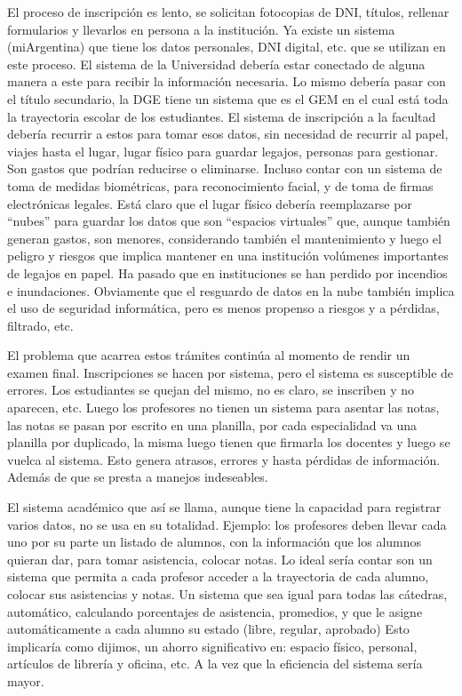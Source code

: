 \documentclass[a4paper]{article}
\begin{document}
El proceso de inscripción es lento, se solicitan fotocopias de DNI, títulos, rellenar formularios y llevarlos en persona a la institución. Ya existe un sistema (miArgentina) que tiene los datos personales, DNI digital, etc. que se utilizan en este proceso. El sistema de la Universidad debería estar conectado de alguna manera a este para recibir la información necesaria. Lo mismo debería pasar con el título secundario, la DGE tiene un sistema que es el GEM en el cual está toda la trayectoria escolar de los estudiantes.  El sistema de inscripción a la facultad debería recurrir a estos para tomar esos datos, sin necesidad de recurrir al papel, viajes hasta el lugar, lugar físico para guardar legajos, personas para gestionar. Son gastos que podrían reducirse o eliminarse. Incluso contar con un sistema de toma de medidas biométricas, para reconocimiento facial, y de toma de firmas electrónicas legales. Está claro que el lugar físico debería reemplazarse por “nubes” para guardar los datos que son “espacios virtuales” que, aunque también generan gastos, son menores, considerando también el mantenimiento y luego el peligro y riesgos que implica mantener en una institución volúmenes importantes de legajos en papel. Ha pasado que en instituciones se han perdido por incendios e inundaciones. Obviamente que el resguardo de datos en la nube también implica el uso de seguridad informática, pero es menos propenso a riesgos y a pérdidas, filtrado, etc. 

El problema que acarrea estos trámites continúa al momento de rendir un examen final. Inscripciones se hacen por sistema, pero el sistema es susceptible de errores. Los estudiantes se quejan del mismo, no es claro, se inscriben y no aparecen, etc. Luego los profesores no tienen un sistema para asentar las notas, las notas se pasan por escrito en una planilla, por cada especialidad va una planilla por duplicado, la misma luego tienen que firmarla los docentes y luego se vuelca al sistema. Esto genera atrasos, errores y hasta pérdidas de información. Además de que se presta a manejos indeseables.  

El sistema académico que así se llama, aunque tiene la capacidad para registrar varios datos, no se usa en su totalidad. Ejemplo: los profesores deben llevar cada uno por su parte un listado de alumnos, con la información que los alumnos quieran dar, para tomar asistencia, colocar notas. Lo ideal sería contar son un sistema que permita a cada profesor acceder a la trayectoria de cada alumno, colocar sus asistencias y notas. Un sistema que sea igual para todas las cátedras, automático, calculando porcentajes de asistencia, promedios, y que le asigne automáticamente a cada alumno su estado (libre, regular, aprobado)
Esto implicaría como dijimos, un ahorro significativo en: espacio físico, personal, artículos de librería y oficina, etc. A la vez que la eficiencia del sistema sería mayor. 
\end{document}
